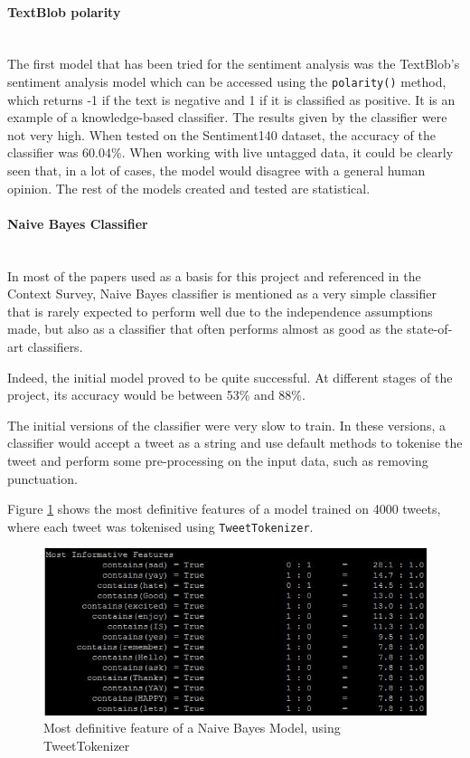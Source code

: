 \paragraph{TextBlob polarity} \mbox{}\\
The first model that has been tried for the sentiment analysis was the TextBlob's sentiment analysis model which can be accessed using the \texttt{polarity()} method, which returns -1 if the text is negative and 1 if it is classified as positive. It is an example of a knowledge-based classifier. The results given by the classifier were not very high. When tested on the Sentiment140 dataset, the accuracy of the classifier was 60.04\%. When working with live untagged data, it could be clearly seen that, in a lot of cases, the model would disagree with a general human opinion. The rest of the models created and tested are statistical. 

\paragraph{Naive Bayes Classifier}\mbox{}\\
In most of the papers used as a basis for this project and referenced in the Context Survey, Naive Bayes classifier is mentioned as a very simple classifier that is rarely expected to perform well due to the independence assumptions made, but also as a classifier that often performs almost as good as the state-of-art classifiers.

Indeed, the initial model proved to be quite successful. At different stages of the project, its accuracy would be between 53\% and 88\%.

The initial versions of the classifier were very slow to train. In these versions, a classifier would accept a tweet as a string and use default methods to tokenise the tweet and perform some pre-processing on the input data, such as removing punctuation. 

Figure \ref{fig:nb4000_twtok} shows the most definitive features of a model trained on 4000 tweets, where each tweet was tokenised using \texttt{TweetTokenizer}.  

\begin{figure}
    \centering
    \includegraphics[width=\textwidth]{NB4000_tw_tokenizer}
    \caption{Most definitive feature of a Naive Bayes Model, using TweetTokenizer}
    \label{fig:nb4000_twtok}
\end{figure}

